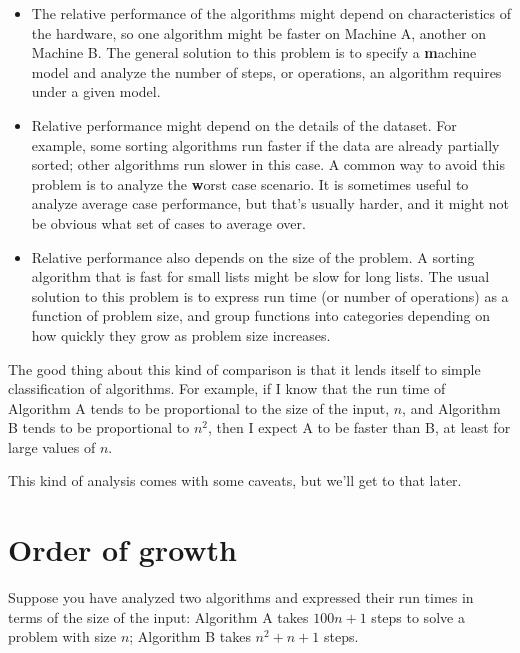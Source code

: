 \documentclass[
DIV=11,
fontsize=12,
twoside,
headinclude=false,
titlepage=firstiscover,
abstract=true,
headsepline=true,
footsepline=true,
chapterprefix=true, %
headings=big,
bibliography=totoc,%
captions=tableheading
]{scrbook}
\theoremstyle{definition}
\begin{document}
\begin{itemize}

\item The relative performance of the algorithms might
depend on characteristics of the hardware, so one algorithm
might be faster on Machine A, another on Machine B.
The general solution to this problem is to specify a
{\textbf machine model} and analyze the number of steps, or
operations, an algorithm requires under a given model.

\item Relative performance might depend on the details of
the dataset.  For example, some sorting
algorithms run faster if the data are already partially sorted;
other algorithms run slower in this case.
A common way to avoid this problem is to analyze the
{\textbf worst case} scenario.  It is sometimes useful to
analyze average case performance, but that's usually harder,
and it might not be obvious what set of cases to average over.

\item Relative performance also depends on the size of the
problem.  A sorting algorithm that is fast for small lists
might be slow for long lists.
The usual solution to this problem is to express run time
(or number of operations) as a function of problem size,
and group functions into categories depending on how quickly
they grow as problem size increases.

\end{itemize}

The good thing about this kind of comparison is that it lends
itself to simple classification of algorithms.  For example,
if I know that the run time of Algorithm A tends to be
proportional to the size of the input, $n$, and Algorithm B
tends to be proportional to $n^2$, then I
expect A to be faster than B, at least for large values of $n$.

This kind of analysis comes with some caveats, but we'll get
to that later.


\section{Order of growth}

Suppose you have analyzed two algorithms and expressed
their run times in terms of the size of the input:
Algorithm A takes $100n+1$ steps to solve a problem with
size $n$; Algorithm B takes $n^2 + n + 1$ steps.
\end{document}
